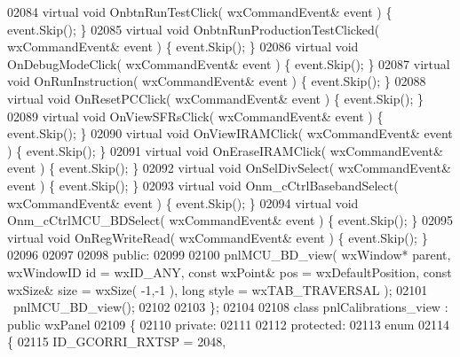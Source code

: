 \begin{DoxyCode}
02084         \textcolor{keyword}{virtual} \textcolor{keywordtype}{void} OnbtnRunTestClick( wxCommandEvent& event ) \{ \textcolor{keyword}{event}.Skip(); \}
02085         \textcolor{keyword}{virtual} \textcolor{keywordtype}{void} OnbtnRunProductionTestClicked( wxCommandEvent& event ) \{ \textcolor{keyword}{event}.Skip(); \}
02086         \textcolor{keyword}{virtual} \textcolor{keywordtype}{void} OnDebugModeClick( wxCommandEvent& event ) \{ \textcolor{keyword}{event}.Skip(); \}
02087         \textcolor{keyword}{virtual} \textcolor{keywordtype}{void} OnRunInstruction( wxCommandEvent& event ) \{ \textcolor{keyword}{event}.Skip(); \}
02088         \textcolor{keyword}{virtual} \textcolor{keywordtype}{void} OnResetPCClick( wxCommandEvent& event ) \{ \textcolor{keyword}{event}.Skip(); \}
02089         \textcolor{keyword}{virtual} \textcolor{keywordtype}{void} OnViewSFRsClick( wxCommandEvent& event ) \{ \textcolor{keyword}{event}.Skip(); \}
02090         \textcolor{keyword}{virtual} \textcolor{keywordtype}{void} OnViewIRAMClick( wxCommandEvent& event ) \{ \textcolor{keyword}{event}.Skip(); \}
02091         \textcolor{keyword}{virtual} \textcolor{keywordtype}{void} OnEraseIRAMClick( wxCommandEvent& event ) \{ \textcolor{keyword}{event}.Skip(); \}
02092         \textcolor{keyword}{virtual} \textcolor{keywordtype}{void} OnSelDivSelect( wxCommandEvent& event ) \{ \textcolor{keyword}{event}.Skip(); \}
02093         \textcolor{keyword}{virtual} \textcolor{keywordtype}{void} Onm_cCtrlBasebandSelect( wxCommandEvent& event ) \{ \textcolor{keyword}{event}.Skip(); \}
02094         \textcolor{keyword}{virtual} \textcolor{keywordtype}{void} Onm_cCtrlMCU_BDSelect( wxCommandEvent& event ) \{ \textcolor{keyword}{event}.Skip(); \}
02095         \textcolor{keyword}{virtual} \textcolor{keywordtype}{void} OnRegWriteRead( wxCommandEvent& event ) \{ \textcolor{keyword}{event}.Skip(); \}
02096         
02097     
02098     \textcolor{keyword}{public}:
02099         
02100         pnlMCU_BD_view( wxWindow* parent, wxWindowID \textcolor{keywordtype}{id} = wxID\_ANY, \textcolor{keyword}{const} wxPoint& pos = wxDefaultPosition,
       \textcolor{keyword}{const} wxSize& size = wxSize( -1,-1 ), \textcolor{keywordtype}{long} style = wxTAB\_TRAVERSAL ); 
02101         ~pnlMCU_BD_view();
02102     
02103 \};
02104 
02108 \textcolor{keyword}{class }pnlCalibrations_view : \textcolor{keyword}{public} wxPanel 
02109 \{
02110     \textcolor{keyword}{private}:
02111     
02112     \textcolor{keyword}{protected}:
02113         \textcolor{keyword}{enum}
02114         \{
02115             ID\_GCORRI\_RXTSP = 2048,

\end{DoxyCode}
